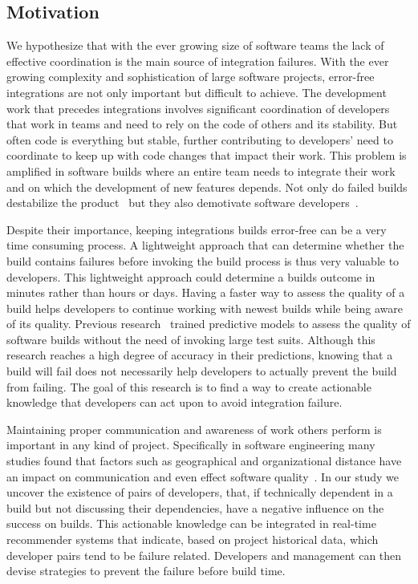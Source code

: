\subsection{Motivation}
We hypothesize that with the ever growing size of software teams the lack of
effective coordination is the main source of integration failures.  With the
ever growing complexity and sophistication of large software projects,
error-free integrations are not only important but difficult to achieve. The
development work that precedes integrations involves significant coordination of
developers that work in teams and need to rely on the code of others and its
stability. But often code is everything but stable, further contributing to
developers' need to coordinate to keep up with code changes that impact their work. This problem is
amplified in software builds where an entire team needs to integrate their work
and on which the development of new features depends. Not only do
failed builds destabilize the product~\cite{cusumano1997} but they also demotivate
software developers~\cite{holck2004}.

Despite their importance, keeping integrations builds error-free can be a very time consuming
process. A lightweight approach that can determine whether the build contains
failures before invoking the build process is thus very valuable to developers.
This lightweight approach could determine a builds outcome in minutes rather than hours or days. Having a faster way to
assess the quality of a build helps developers to continue working with newest
builds while being aware of its quality. Previous
research~\cite{wolf:icse:2009,hassan:ase:2006} trained predictive models to assess the quality of software builds without the need of invoking large test
suits. Although this research
reaches a high degree of accuracy in their predictions, knowing that a
build will fail does not necessarily help developers to actually prevent
the build from failing.
The goal of this research is to find a way to create actionable knowledge that
developers can act upon to avoid
integration failure.

Maintaining proper communication and awareness of work others perform is
important in any kind of project. Specifically in software engineering many studies found
that factors such as geographical and organizational distance have an impact on
communication and even effect software quality~\cite{nagappan:icse:2008}. In our
study we uncover the existence of pairs of
developers, that, if technically dependent in a build but not discussing their
dependencies, have a negative influence on the success on builds. This
actionable knowledge can be integrated in real-time recommender systems that
indicate, based on project historical data, which developer pairs tend to be
failure related. Developers and management can then devise strategies to
prevent the failure before build time. 


